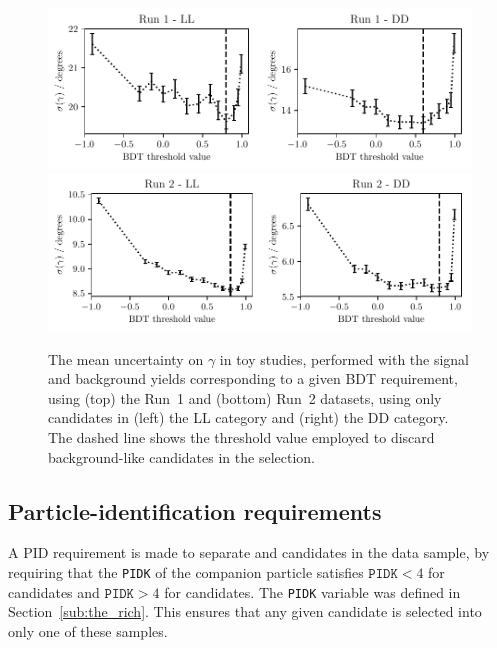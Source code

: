 \begin{figure}[tb]
    \centering
    \includegraphics[width=0.85\columnwidth]{figures/analysis/bdt_gamma_scan_Run1_thesis.pdf}
    \includegraphics[width=0.85\columnwidth]{figures/analysis/bdt_gamma_scan_Run2_thesis.pdf}
    \caption{The mean uncertainty on $\gamma$ in toy studies, performed with the signal and background yields corresponding to a given BDT requirement, using (top) the Run~1 and (bottom) Run~2 datasets, using only candidates in (left) the LL category and (right) the DD category. The dashed line shows the threshold value employed to discard background-like candidates in the selection.}
    \label{fig:bdt_gamma_scan}
\end{figure}


\subsection{Particle-identification requirements} %
\label{sub:particle_identification_requirements}

A PID requirement is made to separate \BtoDK and \BtoDpi candidates in the data sample, by requiring that the \texttt{PIDK} of the companion particle satisfies $\texttt{PIDK} < 4$ for \BtoDpi candidates and $\texttt{PIDK} > 4$ for \BtoDK candidates. The \texttt{PIDK} variable was defined in Section~\ref{sub:the_rich}. This ensures that any given candidate is selected into only one of these samples.

